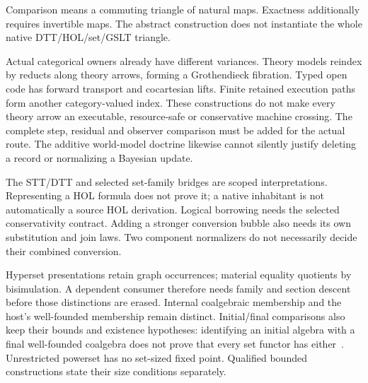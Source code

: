 \documentclass[11pt,a4paper]{article}
\newcommand{\diagramcaption}[1]{\par{\small\color{ink}#1\par}\medskip}
\begin{document}
\begin{center}
\end{center}
\diagramcaption{Comparison means a commuting triangle of natural maps.
Exactness additionally requires invertible maps. The abstract construction
does not instantiate the whole native DTT/HOL/set/GSLT triangle.}

Actual categorical owners already have different variances. Theory models
reindex by reducts along theory arrows, forming a Grothendieck fibration.
Typed open code has forward transport and cocartesian lifts. Finite retained
execution paths form another category-valued index. These constructions do
not make every theory arrow an executable, resource-safe or conservative
machine crossing. The complete step, residual and observer comparison must
be added for the actual route. The additive world-model doctrine likewise
cannot silently justify deleting a record or normalizing a Bayesian update.

The STT/DTT and selected set-family bridges are scoped interpretations.
Representing a HOL formula does not prove it; a native inhabitant is not
automatically a source HOL derivation. Logical borrowing needs the selected
conservativity contract. Adding a stronger conversion bubble also needs its
own substitution and join laws. Two component normalizers do not necessarily
decide their combined conversion.

Hyperset presentations retain graph occurrences; material equality quotients
by bisimulation. A dependent consumer therefore needs family and section
descent before those distinctions are erased. Internal coalgebraic membership
and the host's well-founded membership remain distinct. Initial/final
comparisons also keep their bounds and existence hypotheses: identifying an
initial algebra with a final well-founded coalgebra does not prove that every
set functor has either~\cite{WellPointed}. Unrestricted powerset has no
set-sized fixed point. Qualified bounded constructions state their size
conditions separately.
\end{document}
